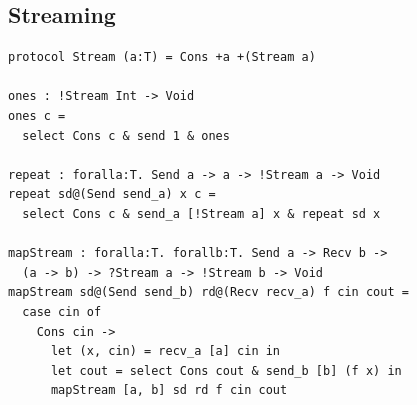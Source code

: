 \subsection{Streaming}
\label{sec:streaming}

\begin{lstlisting}
protocol Stream (a:T) = Cons +a +(Stream a)

ones : !Stream Int -> Void
ones c =
  select Cons c & send 1 & ones

repeat : foralla:T. Send a -> a -> !Stream a -> Void
repeat sd@(Send send_a) x c =
  select Cons c & send_a [!Stream a] x & repeat sd x

mapStream : foralla:T. forallb:T. Send a -> Recv b ->
  (a -> b) -> ?Stream a -> !Stream b -> Void
mapStream sd@(Send send_b) rd@(Recv recv_a) f cin cout =
  case cin of
    Cons cin -> 
      let (x, cin) = recv_a [a] cin in
      let cout = select Cons cout & send_b [b] (f x) in
      mapStream [a, b] sd rd f cin cout
\end{lstlisting}


